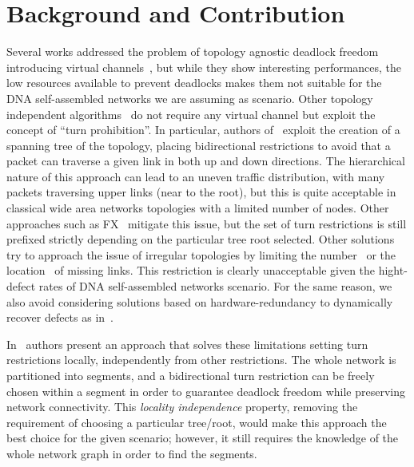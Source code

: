 \section{Background and Contribution}
\label{sec:related_works}
Several works addressed the problem of topology agnostic deadlock
freedom introducing virtual channels~\cite{sancho2002, skeie2002,
skeie2004, koibuchi2003}, but while they show interesting
performances, the low resources available to prevent deadlocks makes them not suitable for
the DNA self-assembled networks we are assuming as
scenario.
Other topology independent algorithms~\cite{schroeder1991,
koibuchi2001, cherkasova1996} do not require any virtual channel but
exploit the concept of ``turn prohibition''.
In particular, authors of~\cite{Patwardhan05evaluatingthe} exploit the creation of a spanning tree of the
topology, placing bidirectional restrictions to avoid that a packet
can traverse a given link in both up and down directions.
The hierarchical nature of this approach can lead to an uneven traffic
distribution, with many packets traversing upper links (near to the
root), but this is quite acceptable in classical wide area networks
topologies with a limited number of nodes. Other approaches such as
FX~\cite{sancho2000} mitigate this
issue, but the set of turn restrictions is still prefixed
strictly depending on the particular tree root selected. 
Other solutions try to approach the issue of irregular
topologies by limiting the number~\cite{duato1997, gomez2004, koibuchi2008} or the
location~\cite{zhang2008, flich2008, liu2011} of missing links. This
restriction is clearly unacceptable given the hight-defect rates of
DNA self-assembled networks scenario. For the same reason, we also
avoid considering solutions based on hardware-redundancy to
dynamically recover defects as in~\cite{constantinides2006, kohler2010,  park2006, ebrahimi2013}. 

In~\cite{mejia_ipdps06} authors present an approach that solves these
limitations setting turn restrictions locally,
independently from other restrictions. The whole network is
partitioned into segments, and a bidirectional turn
restriction can be freely chosen within a segment in order to guarantee
deadlock freedom while preserving network connectivity. This \emph{locality
independence} property, removing the requirement of choosing a particular tree/root,
would make this approach the best choice for the given scenario;
however, it still requires the knowledge of the
whole network graph in order to find the segments.

